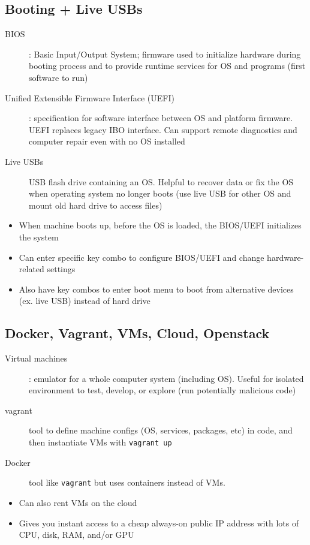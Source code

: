 \documentclass[letterpaper,12pt]{article}
\begin{document}
\subsection{Booting + Live USBs}
\begin{description}
 \item[BIOS]: Basic Input/Output System; firmware used to initialize hardware during booting process and to provide runtime services for OS and programs (first software to run)
 \item[Unified Extensible Firmware Interface (UEFI)]: specification for software interface between OS and platform firmware. UEFI replaces legacy IBO interface. Can support remote diagnostics and computer repair even with no OS installed
 \item[Live USBs] USB flash drive containing an OS. Helpful to recover data or fix the OS when operating system no longer boots (use live USB for other OS and mount old hard drive to access files)
\end{description}

\begin{itemize}
 \item When machine boots up, before the OS is loaded, the BIOS/UEFI initializes the system
 \item Can enter specific key combo to configure BIOS/UEFI and change hardware-related settings
 \item Also have key combos to enter boot menu to boot from alternative devices (ex. live USB) instead of hard drive
\end{itemize}

\subsection{Docker, Vagrant, VMs, Cloud, Openstack}
\begin{description}
 \item[Virtual machines]: emulator for a whole computer system (including OS). Useful for isolated environment to test, develop, or explore (run potentially malicious code)
 \item[vagrant] tool to define machine configs (OS, services, packages, etc) in code, and then instantiate VMs with \lstinline{vagrant up}
 \item[Docker] tool like \lstinline{vagrant} but uses containers instead of VMs.
\end{description}

\begin{itemize}
 \item Can also rent VMs on the cloud
 \item Gives you instant access to a cheap always-on public IP address with lots of CPU, disk, RAM, and/or GPU
\end{itemize}
\end{document}

